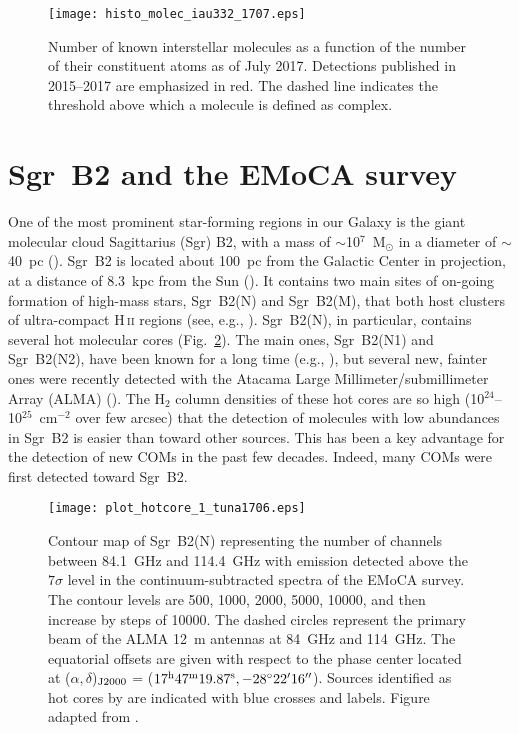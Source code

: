 \documentclass{iau}
\begin{document}
\begin{figure}
\begin{center}
\texttt{[image: histo\_molec\_iau332\_1707.eps]}
\end{center}
\caption{Number of known interstellar molecules as a function of the number of 
their constituent atoms as of July 2017. Detections 
published in 2015--2017 are emphasized in red. The dashed line indicates the 
threshold above which a molecule is defined as complex.}
\label{f:histo}
\end{figure}

\section{Sgr~B2 and the EMoCA survey}
\label{s:emoca}

One of the most prominent star-forming regions in our Galaxy is the giant 
molecular cloud Sagittarius (Sgr) B2, with a mass of $\sim$10$^7$~M$_\odot$ in
a diameter of $\sim$40~pc (\cite{Lis90}). Sgr~B2 is located about 100~pc from 
the Galactic Center in projection, at a distance of 8.3~kpc from the Sun 
(\cite{Reid14}). It contains two main sites of on-going formation of high-mass 
stars, Sgr~B2(N) and Sgr~B2(M), that both host clusters of ultra-compact 
H\,\textsc{\lowercase{II}} regions (see, e.g., \cite{Gaume95,Schmiedeke16}).
Sgr~B2(N), in particular, contains several hot molecular cores 
(Fig.~\ref{f:linecountmap}). The main ones, Sgr~B2(N1) and Sgr~B2(N2), have 
been known for a long time (e.g., 
\cite{Snyder94,Belloche08,Qin11,Belloche16}), but several new, fainter ones 
were recently detected with the Atacama Large Millimeter/submillimeter Array 
(ALMA) (\cite{Bonfand17,SanchezMonge17}). The H$_2$ column densities of these 
hot cores are so high (10$^{24}$--10$^{25}$~cm$^{-2}$ over few arcsec) that the 
detection of molecules with low abundances in Sgr~B2 is easier than toward 
other sources. This has been a key advantage for the detection of new COMs in 
the past few decades. Indeed, many COMs were first detected toward Sgr~B2. 

\begin{figure}
\begin{center}
\texttt{[image: plot\_hotcore\_1\_tuna1706.eps]}
\end{center}
\caption{Contour map of Sgr~B2(N) representing the number of channels between 
84.1~GHz and 114.4~GHz with emission detected above the $7\sigma$ level in the 
continuum-subtracted spectra of the EMoCA survey. The contour levels are 500, 
1000, 2000, 5000, 10000, and then increase by steps of 10000. The dashed 
circles represent the primary beam of the ALMA 12~m antennas at 84~GHz and 
114~GHz. The equatorial offsets are given with respect to the phase center 
located at ($\alpha, \delta$)$_{\rm J2000}$ =
($17^{\rm h}47^{\rm m}19.87^{\rm s}, -28^\circ22'16''$).
Sources identified as hot cores by \cite{Bonfand17} are indicated with blue 
crosses and labels. Figure adapted from \cite{Bonfand17}.}
\label{f:linecountmap}
\end{figure}
\end{document}
